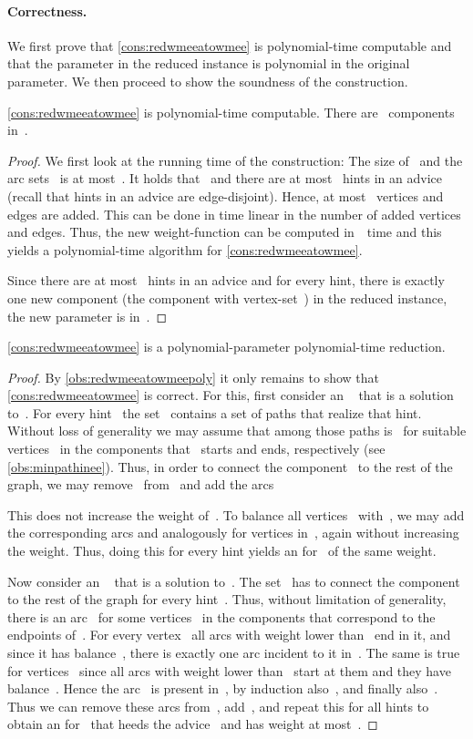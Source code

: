 \paragraph{Correctness.} We first prove that \autoref{cons:redwmeeatowmee} is polynomial-time computable and that the parameter in the reduced instance is polynomial in the original parameter. We then proceed to show the soundness of the construction.
\begin{observation}\label{obs:redwmeeatowmeepoly}
  \autoref{cons:redwmeeatowmee} is polynomial-time computable. There are~ components in~.
\end{observation}
\begin{proof}
  We first look at the running time of the construction: The size of~ and the arc sets~ is at most~. It holds that~ and there are at most~ hints in an advice (recall that hints in an advice are edge-disjoint). Hence, at most~ vertices and edges are added. This can be done in time linear in the number of  added vertices and edges. Thus, the new weight-function can be computed in~~time and this yields a polynomial-time algorithm for \autoref{cons:redwmeeatowmee}.

  Since there are at most~ hints in an advice and for every hint, there is exactly one new component (the component with vertex-set~) in the reduced instance, the new parameter is in~.
\end{proof}
\begin{lemma}
  \autoref{cons:redwmeeatowmee} is a polynomial-parameter polynomial-time reduction.
\end{lemma}
\begin{proof}
  By \autoref{obs:redwmeeatowmeepoly} it only remains to show that \autoref{cons:redwmeeatowmee} is correct. For this, first consider an \EE{}~ that is a solution to~. For every hint~ the set~ contains a set of paths that realize that hint. Without loss of generality we may assume that among those paths is~ for suitable vertices~ in the components that~ starts and ends, respectively (see \autoref{obs:minpathinee}). Thus, in order to connect the component~ to the rest of the graph, we may remove~ from~ and add the arcs

This does not increase the weight of~. To balance all vertices~ with~, we may add the corresponding arcs  and analogously for vertices in~, again without increasing the weight. Thus, doing this for every hint yields an \EE{} for~ of the same weight.

Now consider an \EE{}~ that is a solution to~. The set~ has to connect the component~ to the rest of the graph for every hint~. Thus, without limitation of generality, there is an arc~ for some vertices~ in the components that correspond to the endpoints of~. For every vertex~ all arcs with weight lower than~ end in it, and since it has balance~, there is exactly one arc incident to it in~. The same is true for vertices~ since all arcs with weight lower than~ start at them and they have balance~. Hence the arc~ is present in~, by induction also~, and finally also~. Thus we can remove these arcs from~, add~, and repeat this for all hints to obtain an \EE{} for~ that heeds the advice~ and has weight at most~.
\end{proof}
